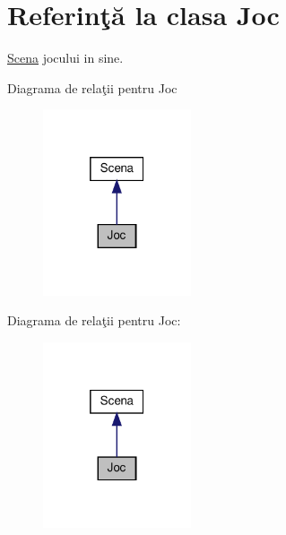 \hypertarget{classJoc}{}\section{Referinţă la clasa Joc}
\label{classJoc}


\hyperlink{classScena}{Scena} jocului in sine.  




Diagrama de relaţii pentru Joc
\nopagebreak
\begin{figure}[H]
\begin{center}
\leavevmode
\includegraphics[width=124pt]{classJoc__inherit__graph}
\end{center}
\end{figure}


Diagrama de relaţii pentru Joc\+:
\nopagebreak
\begin{figure}[H]
\begin{center}
\leavevmode
\includegraphics[width=124pt]{classJoc__coll__graph}
\end{center}
\end{figure}
